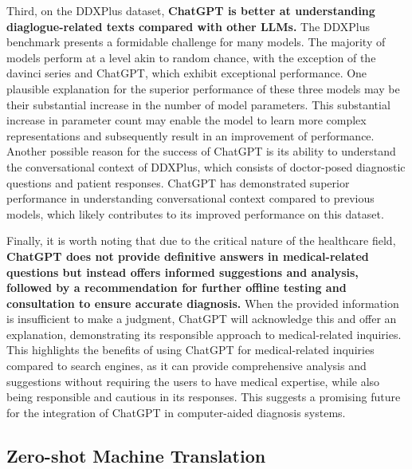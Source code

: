 \documentclass[11pt]{article}
\newcommand{\chat}{ChatGPT\xspace}
\newcommand{\ddx}{DDXPlus\xspace}
\begin{document}
Third, on the \ddx dataset, \textbf{\chat is better at understanding diaglogue-related texts compared with other LLMs.}
The \ddx benchmark presents a formidable challenge for many models. The majority of models perform at a level akin to random chance, with the exception of the davinci series and \chat, which exhibit exceptional performance.
One plausible explanation for the superior performance of these three models may be their substantial increase in the number of model parameters.
This substantial increase in parameter count may enable the model to learn more complex representations and subsequently result in an improvement of performance.
Another possible reason for the success of \chat is its ability to understand the conversational context of \ddx, which consists of doctor-posed diagnostic questions and patient responses.
\chat has demonstrated superior performance in understanding conversational context compared to previous models, which likely contributes to its improved performance on this dataset.

Finally, it is worth noting that due to the critical nature of the healthcare field, \textbf{\chat does not provide definitive answers in medical-related questions but instead offers informed suggestions and analysis, followed by a recommendation for further offline testing and consultation to ensure accurate diagnosis.}
When the provided information is insufficient to make a judgment, \chat will acknowledge this and offer an explanation, demonstrating its responsible approach to medical-related inquiries.
This highlights the benefits of using \chat for medical-related inquiries compared to search engines, as it can provide comprehensive analysis and suggestions without requiring the users to have medical expertise, while also being responsible and cautious in its responses.
This suggests a promising future for the integration of \chat in computer-aided diagnosis systems.



\subsection{Zero-shot Machine Translation}
\end{document}
